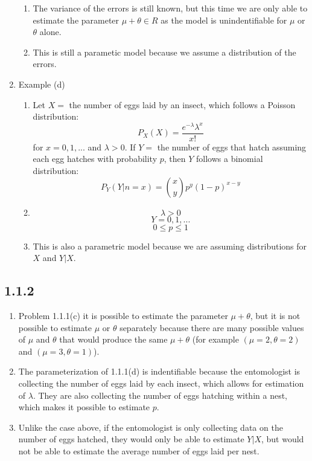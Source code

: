 \documentclass[a4paper,12pt]{article}
\begin{document}
\begin{enumerate}
\begin{enumerate}
      \item The variance of the errors is still known, but this time we are only able to estimate the parameter $\mu+\theta\in R$ as the model is unindentifiable for $\mu$ or $\theta$ alone.
      \item This is still a parametic model because we assume a distribution of the errors.
    \end{enumerate}
    \item Example (d)
    \begin{enumerate}
       \item Let $X=$ the number of eggs laid by an insect, which follows a Poisson distribution:$$P_X(X)=\frac{e^{-\lambda}\lambda^x}{x!}$$ for $x=0,1,...$ and $\lambda>0$. If $Y=$ the number of eggs that hatch assuming each egg hatches with probability $p$, then $Y$ follows a binomial distribution:$$P_Y(Y|n=x)={x\choose y}p^y(1-p)^{x-y}$$
       \item $$\lambda>0$$ $$Y=0,1,...$$ $$0\leq p\leq 1$$
       \item This is also a parametric model because we are assuming distributions for $X$ and $Y|X$.
     \end{enumerate}
\end{enumerate}
\subsection{1.1.2}
\begin{enumerate}
  \item Problem 1.1.1(c) it is possible to estimate the parameter $\mu+\theta$, but it is not possible to estimate $\mu$ or $\theta$ separately because there are many possible values of $\mu$ and $\theta$ that would produce the same $\mu+\theta$ (for example $(\mu=2,\theta=2)$ and $(\mu=3,\theta=1)$).
  \item The parameterization of 1.1.1(d) is indentifiable because the entomologist is collecting the number of eggs laid by each insect, which allows for estimation of $\lambda$. They are also collecting the number of eggs hatching within a nest, which makes it possible to estimate $p$.
  \item Unlike the case above, if the entomologist is only collecting data on the number of eggs hatched, they would only be able to estimate $Y|X$, but would not be able to estimate the average number of eggs laid per nest.
\end{enumerate}
\end{document}
